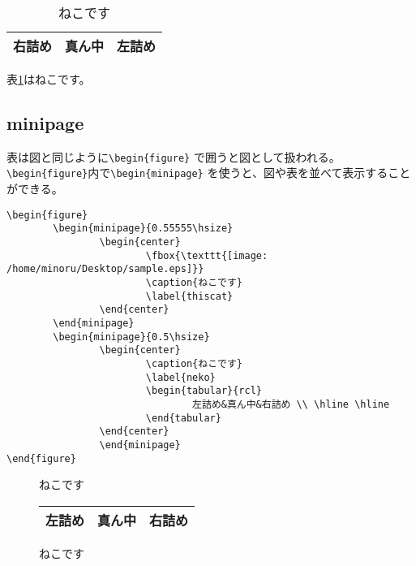 \documentclass{jsarticle}
\begin{document}
\begin{table}[htbp]
	\centering
	\caption{ねこです}
	\label{nekodesu}
	\begin{tabular}{|r|c|l|} \hline
	右詰め&真ん中&左詰め \\ \hline
	\end{tabular}
\end{table}

表\ref{nekodesu}はねこです。\par

\subsection{minipage}

表は図と同じように\verb|\begin{figure}|
で囲うと図として扱われる。
\verb|\begin{figure}|内で\verb|\begin{minipage}|
を使うと、図や表を並べて表示することができる。\par

\begin{verbatim}
\begin{figure}
		\begin{minipage}{0.55555\hsize}
				\begin{center}
						\fbox{\texttt{[image: /home/minoru/Desktop/sample.eps]}}
						\caption{ねこです}
						\label{thiscat}
				\end{center}
		\end{minipage}
		\begin{minipage}{0.5\hsize}
				\begin{center}
						\caption{ねこです}
						\label{neko}
						\begin{tabular}{rcl}
								左詰め&真ん中&右詰め \\ \hline \hline
						\end{tabular}
				\end{center}
				\end{minipage}
\end{figure}
\end{verbatim}

\begin{figure}
		\begin{minipage}{0.5\hsize}
				\begin{center}
						\caption{ねこです}
						\label{thiscat}
				\end{center}
		\end{minipage}
		\begin{minipage}{0.5\hsize}
				\begin{center}
						\caption{ねこです}
						\label{neko}
						\begin{tabular}{|r|c|l|} \hline
								左詰め&真ん中&右詰め \\ \hline
						\end{tabular}
				\end{center}
				\end{minipage}
\end{figure}
\end{document}
